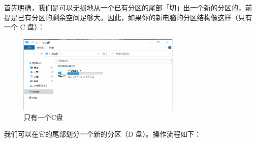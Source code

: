 首先明确，我们是可以无损地从一个已有分区的尾部「切」出一个新的分区的，前提是已有分区的剩余空间足够大。因此，如果你的新电脑的分区结构像这样（只有一个 C 盘）：

\begin{figure}[htb!]
  \centering
  \includegraphics[width=8cm]{assets/One_Volume.jpg}
  \caption{只有一个C盘}
  \label{one-volume}
\end{figure}

我们可以在它的尾部划分一个新的分区（D 盘）。操作流程如下：

